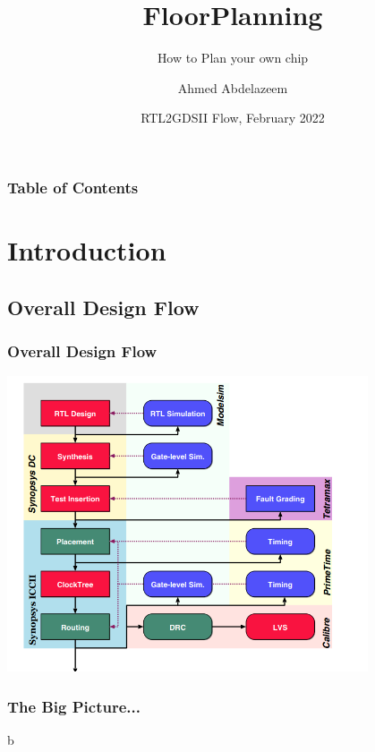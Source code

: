 \documentclass[compress]{beamer}
\title[ASIC Physical Design] %
{FloorPlanning}
\subtitle{How to Plan your own chip}
\author[Ahmed Abdelazeem] %
{Ahmed Abdelazeem}
\institute[ZU] %
{
	Faculty of Engineering\\
	Zagazig University
}
\date[ZU 2023] %
{RTL2GDSII Flow, February 2022}
\begin{document}
	
	\frame{\titlepage}
	
	
	\begin{frame}
		\frametitle{Table of Contents}
		\tableofcontents
	\end{frame}
	\section[Intro]{Introduction}
	\subsection[Overall]{Overall Design Flow}
	\begin{frame}
		\frametitle{Overall Design Flow}
		
		\begin{center}
			\includegraphics[width=0.8\textwidth]{over}
		\end{center}
	\end{frame}	
	\begin{frame}
		\frametitle{The Big Picture...}
		b
	\end{frame}
\end{document}
